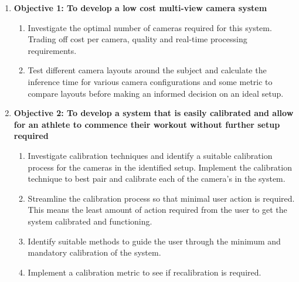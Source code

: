 \begin{enumerate}
    \item \textbf{Objective 1: To develop a low cost multi-view camera system}
        \begin{enumerate}
            \item Investigate the optimal number of cameras required for this system. Trading off cost per camera, quality and real-time processing requirements.
            \item Test different camera layouts around the subject and calculate the inference time for various camera configurations and some metric to compare layouts before making an informed decision on an ideal setup.
        \end{enumerate}
    
    \item \textbf{Objective 2: To develop a system that is easily calibrated and allow for an athlete to commence their workout without further setup required}
        \begin{enumerate}
            \item Investigate calibration techniques and identify a suitable calibration process for the cameras in the identified setup. Implement the calibration technique to best pair and calibrate each of the camera's in the system.
            \item Streamline the calibration process so that minimal user action is required. This means the least amount of action required from the user to get the system calibrated and functioning.
            \item Identify suitable methods to guide the user through the minimum and mandatory calibration of the system.
            \item Implement a calibration metric to see if recalibration is required.
        \end{enumerate}
        

\end{enumerate}
